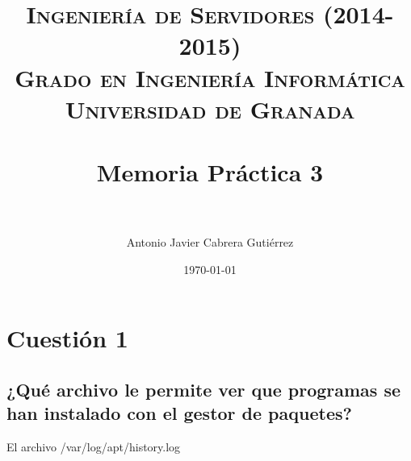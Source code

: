 


\title{	
\normalfont \normalsize 
\textsc{{\bf Ingeniería de Servidores (2014-2015)} \\ Grado en Ingeniería Informática \\ Universidad de Granada} \\ [25pt] %
\horrule{0.5pt} \\[0.4cm] %
\huge Memoria Práctica 3 \\ %
\horrule{2pt} \\[0.5cm] %
}

\author{Antonio Javier Cabrera Gutiérrez } %

\date{\normalsize\today} %




\maketitle %

\newpage %

\tableofcontents %

\listoffigures



\newpage
\section{Cuestión 1}
\subsection{¿Qué archivo le permite ver que programas se han instalado con el gestor de paquetes?}
El archivo /var/log/apt/history.log
